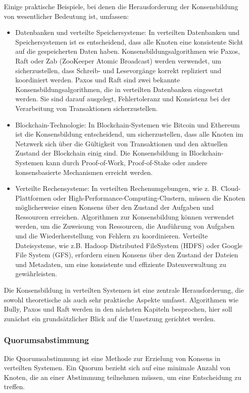 \documentclass[../vs-script-first-v01.tex]{subfiles}
\begin{document}
Einige praktische Beispiele, bei denen die Herausforderung der Konsensbildung von wesentlicher Bedeutung ist, umfassen:
\begin{itemize}
\item Datenbanken und verteilte Speichersysteme: In verteilten Datenbanken und Speichersystemen ist es entscheidend, dass alle Knoten eine konsistente Sicht auf die gespeicherten Daten haben. Konsensbildungsalgorithmen wie Paxos, Raft oder Zab (ZooKeeper Atomic Broadcast) werden verwendet, um sicherzustellen, dass Schreib- und Lesevorgänge korrekt repliziert und koordiniert werden. 
Paxos und Raft sind zwei bekannte Konsensbildungsalgorithmen, die in verteilten Datenbanken eingesetzt werden. Sie sind darauf ausgelegt, Fehlertoleranz und Konsistenz bei der Verarbeitung von Transaktionen sicherzustellen.

\item Blockchain-Technologie: In Blockchain-Systemen wie Bitcoin und Ethereum ist die Konsensbildung entscheidend, um sicherzustellen, dass alle Knoten im Netzwerk sich über die Gültigkeit von Transaktionen und den aktuellen Zustand der Blockchain einig sind. Die Konsensbildung in Blockchain-Systemen kann durch Proof-of-Work, Proof-of-Stake oder andere konsensbasierte Mechanismen erreicht werden.

\item Verteilte Rechensysteme: In verteilten Rechenumgebungen, wie z. B. Cloud-Plattformen oder High-Performance-Computing-Clustern, müssen die Knoten möglicherweise einen Konsens über den Zustand der Aufgaben und Ressourcen erreichen. Algorithmen zur Konsensbildung können verwendet werden, um die Zuweisung von Ressourcen, die Ausführung von Aufgaben und die Wiederherstellung von Fehlern zu koordinieren. Verteilte Dateisysteme, wie z.B. Hadoop Distributed FileSystem (HDFS) oder Google File System (GFS), erfordern einen Konsens über den Zustand der Dateien und Metadaten, um eine konsistente und effiziente Datenverwaltung zu gewährleisten.
\end{itemize}
Die Konsensbildung in verteilten Systemen ist eine zentrale Herausforderung, die sowohl theoretische als auch sehr praktische Aspekte umfasst. Algorithmen wie Bully, Paxos und Raft werden in den nächsten Kapiteln besprochen, hier soll zunächst ein grundsätzlicher Blick auf die Umsetzung gerichtet werden.

\subsubsection{Quorumsabstimmung}
Die Quorumsabstimmung ist eine Methode zur Erzielung von Konsens in verteilten Systemen. Ein Quorum bezieht sich auf eine minimale Anzahl von Knoten, die an einer Abstimmung teilnehmen müssen, um eine Entscheidung zu treffen.
\end{document}
